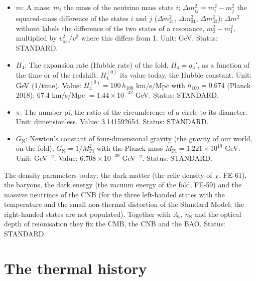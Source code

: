 \documentclass[
  10pt,
]{article}
\begin{document}
\begin{itemize}
  three neutrino mass states; in a frame component such as
  \(\mathcal{S}^{(i)}{}_{(i)}\) one of the three directions of ordinary
  space (the three components are equal); a repeated index is not summed
  unless a sum sign is written. Status: STANDARD.
\item
  \(m\): A mass: \(m_i\) the mass of the neutrino mass state \(i\);
  \(\Delta m_{ij}^2 = m_i^2 - m_j^2\) the squared-mass difference of the
  states \(i\) and \(j\) (\(\Delta m_{21}^2\), \(\Delta m_{31}^2\),
  \(\Delta m_{32}^2\)); \(\Delta m^2\) without labels the difference of
  the two states of a resonance, \(m_2^2 - m_1^2\), multiplied by
  \(v_{\mathrm{loc}}^2/v^2\) where this differs from 1. Unit: GeV.
  Status: STANDARD.
\item
  \(H_4\): The expansion rate (Hubble rate) of the fold, \(H_4 = a_4'\),
  as a function of the time or of the redshift; \(H_4^{(0)}\) its value
  today, the Hubble constant. Unit: GeV (1/time). Value:
  \(H_4^{(0)} = 100\,h_{100}\) km/s/Mpc with \(h_{100} = 0.674\) (Planck
  2018): 67.4 km/s/Mpc \(= 1.44\times10^{-42}\) GeV. Status: STANDARD.
\item
  \(\pi\): The number pi, the ratio of the circumference of a circle to
  its diameter. Unit: dimensionless. Value: 3.141592654. Status:
  STANDARD.
\item
  \(G_{\mathrm{N}}\): Newton's constant of four-dimensional gravity (the
  gravity of our world, on the fold),
  \(G_{\mathrm{N}} = 1/M_{\mathrm{Pl}}^2\) with the Planck mass
  \(M_{\mathrm{Pl}} = 1.221\times10^{19}\) GeV. Unit: GeV\(^{-2}\).
  Value: \(6.708\times10^{-39}\) GeV\(^{-2}\). Status: STANDARD.
\end{itemize}

The density parameters today: the dark matter (the relic density of
\(\chi\), FE-61), the baryons, the dark energy (the vacuum energy of the
fold, FE-59) and the massive neutrinos of the CNB (for the three
left-handed states with the temperature and the small non-thermal
distortion of the Standard Model; the right-handed states are not
populated). Together with \(A_{\mathrm{s}}\), \(n_{\mathrm{S}}\) and the
optical depth of reionisation they fix the CMB, the CNB and the BAO.
Status: STANDARD.

\hypertarget{the-thermal-history}{%
\section{The thermal history}\label{the-thermal-history}}
\end{document}

